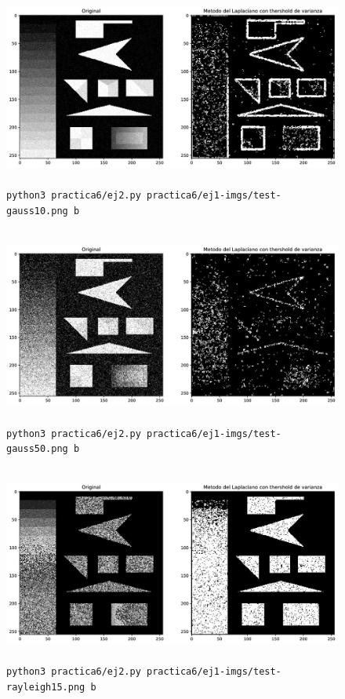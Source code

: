 \documentclass[11pt, spanish]{article}
\begin{document}
\begin{figure}[H]
\centering
    \includegraphics[height=6.5cm]{informe-imgs/ej2-b-test-gauss10.jpg}
    \caption{\texttt{python3 practica6/ej2.py practica6/ej1-imgs/test-gauss10.png b}}
\end{figure}

\begin{figure}[H]
\centering
    \includegraphics[height=6.5cm]{informe-imgs/ej2-b-test-gauss50.jpg}
    \caption{\texttt{python3 practica6/ej2.py practica6/ej1-imgs/test-gauss50.png b}}
\end{figure}

\begin{figure}[H]
\centering
    \includegraphics[height=6.5cm]{informe-imgs/ej2-b-test-rayleigh15.jpg}
    \caption{\texttt{python3 practica6/ej2.py practica6/ej1-imgs/test-rayleigh15.png b}}
\end{figure}
\end{document}
